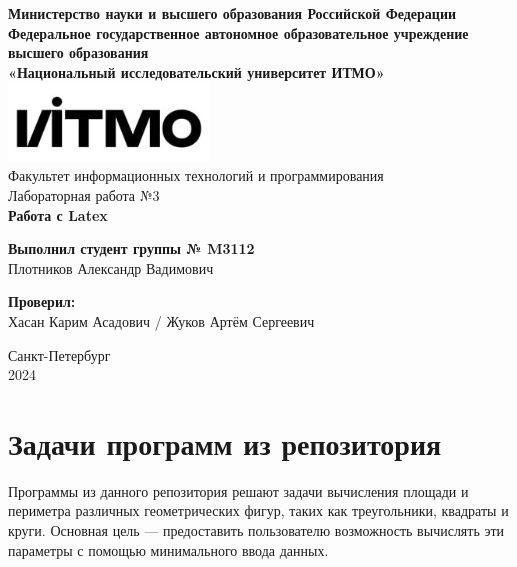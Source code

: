 \documentclass[a4paper, 14pt]{extarticle}
\begin{document}
	
	\begin{titlepage}
		\centering
		\large
		\textbf{Министерство науки и высшего образования Российской Федерации}\\
		\vspace{0.7cm}
		\textbf{Федеральное государственное автономное образовательное учреждение высшего образования}\\
		\textbf{«Национальный исследовательский университет ИТМО»}\\
		\vspace{1.5cm}
		\includegraphics[width=0.4\textwidth]{itmologo.jpg}\\
		\vspace{2cm}
		Факультет информационных технологий и программирования\\
		\vspace{3cm}
		{\normalsize Лабораторная работа №3}\\
		\vspace{0.5cm}
		{\LARGE \textbf{Работа с Latex}}\\
		\vfill
		\hfill
		\begin{flushright}
			\small
			\textbf{Выполнил студент группы № M3112} \\ 
			Плотников Александр Вадимович \\[1cm]
			
			\begin{minipage}{0.4\textwidth}
				\flushright
				\textbf{Проверил:} \\
				Хасан Карим Асадович / Жуков Артём Сергеевич\\
			\end{minipage}
		\end{flushright}
		
		\vfill
		Санкт-Петербург\\
		2024
	\end{titlepage}
	
	\newpage
	
	\tableofcontents
	
	\newpage
	
	\section{Задачи программ из репозитория}
	Программы из данного репозитория решают задачи вычисления площади и периметра различных геометрических фигур, таких как треугольники, квадраты и круги. Основная цель — предоставить пользователю возможность вычислять эти параметры с помощью минимального ввода данных.
	
\end{document}

